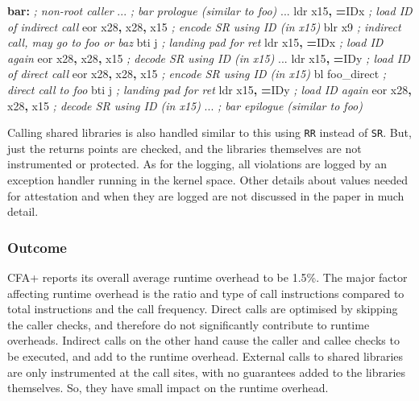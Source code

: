 \documentclass[a4paper, nobind]{templates/ociamthesis}
\newenvironment{Shaded}{\begin{snugshade}}{\end{snugshade}}
\newcommand{\CommentTok}[1]{\textcolor[rgb]{0.56,0.35,0.01}{\textit{#1}}}
\newcommand{\FunctionTok}[1]{\textcolor[rgb]{0.13,0.29,0.53}{\textbf{#1}}}
\newcommand{\NormalTok}[1]{#1}
\newcommand{\OperatorTok}[1]{\textcolor[rgb]{0.81,0.36,0.00}{\textbf{#1}}}
\renewenvironment{Shaded}
{
  \vspace{10pt}%
  \begin{snugshade}%
}{%
  \end{snugshade}%
  \vspace{8pt}%
}
\begin{document}
\begin{Shaded}
\begin{Highlighting}[]
\FunctionTok{bar:}                    \CommentTok{; non{-}root caller}
\NormalTok{  ...                   }\CommentTok{; bar prologue (similar to foo)}
\NormalTok{  ...}
\NormalTok{  ldr x15}\OperatorTok{,} \OperatorTok{=}\NormalTok{IDx         }\CommentTok{; load ID of indirect call}
\NormalTok{  eor x28}\OperatorTok{,}\NormalTok{ x28}\OperatorTok{,}\NormalTok{ x15     }\CommentTok{; encode SR using ID (in x15)}
\NormalTok{  blr x9                }\CommentTok{; indirect call, may go to foo or baz}
\NormalTok{  bti j                 }\CommentTok{; landing pad for ret}
\NormalTok{  ldr x15}\OperatorTok{,} \OperatorTok{=}\NormalTok{IDx         }\CommentTok{; load ID again}
\NormalTok{  eor x28}\OperatorTok{,}\NormalTok{ x28}\OperatorTok{,}\NormalTok{ x15     }\CommentTok{; decode SR using ID (in x15)}
\NormalTok{  ...}
\NormalTok{  ldr x15}\OperatorTok{,} \OperatorTok{=}\NormalTok{IDy         }\CommentTok{; load ID of direct call}
\NormalTok{  eor x28}\OperatorTok{,}\NormalTok{ x28}\OperatorTok{,}\NormalTok{ x15     }\CommentTok{; encode SR using ID (in x15)}
\NormalTok{  bl foo\_direct         }\CommentTok{; direct call to foo}
\NormalTok{  bti j                 }\CommentTok{; landing pad for ret}
\NormalTok{  ldr x15}\OperatorTok{,} \OperatorTok{=}\NormalTok{IDy         }\CommentTok{; load ID again}
\NormalTok{  eor x28}\OperatorTok{,}\NormalTok{ x28}\OperatorTok{,}\NormalTok{ x15     }\CommentTok{; decode SR using ID (in x15)}
\NormalTok{  ...                   }\CommentTok{; bar epilogue (similar to foo)}
\end{Highlighting}
\end{Shaded}

Calling shared libraries is also handled similar to this using \texttt{RR} instead of \texttt{SR}.
But, just the returns points are checked, and the libraries themselves are not
instrumented or protected. As for the logging, all violations are logged by an
exception handler running in the kernel space. Other details about values needed for
attestation and when they are logged are not discussed in the paper in much detail.

\subsubsection{Outcome}\label{outcome}

CFA+ reports its overall average runtime overhead to be 1.5\%.
The major factor affecting runtime overhead is the ratio and type of call instructions
compared to total instructions and the call frequency.
Direct calls are optimised by skipping the caller checks, and therefore do not
significantly contribute to runtime overheads. Indirect calls on the other hand
cause the caller and callee checks to be executed, and add to the runtime overhead.
External calls to shared libraries are only instrumented at the call sites, with
no guarantees added to the libraries themselves. So, they have small impact on
the runtime overhead.
\end{document}
